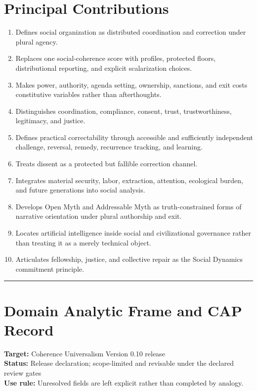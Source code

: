 \documentclass[
  11pt,
]{article}
\providecommand{\tightlist}{%
  \setlength{\itemsep}{0pt}\setlength{\parskip}{0pt}}
\begin{document}
\section{Principal Contributions}\label{principal-contributions}

\begin{enumerate}
\def\labelenumi{\arabic{enumi}.}
\tightlist
\item
  Defines social organization as distributed coordination and correction
  under plural agency.
\item
  Replaces one social-coherence score with profiles, protected floors,
  distributional reporting, and explicit scalarization choices.
\item
  Makes power, authority, agenda setting, ownership, sanctions, and exit
  costs constitutive variables rather than afterthoughts.
\item
  Distinguishes coordination, compliance, consent, trust,
  trustworthiness, legitimacy, and justice.
\item
  Defines practical correctability through accessible and sufficiently
  independent challenge, reversal, remedy, recurrence tracking, and
  learning.
\item
  Treats dissent as a protected but fallible correction channel.
\item
  Integrates material security, labor, extraction, attention, ecological
  burden, and future generations into social analysis.
\item
  Develops Open Myth and Addressable Myth as truth-constrained forms of
  narrative orientation under plural authorship and exit.
\item
  Locates artificial intelligence inside social and civilizational
  governance rather than treating it as a merely technical object.
\item
  Articulates fellowship, justice, and collective repair as the Social
  Dynamics commitment principle.
\end{enumerate}

\begin{center}\rule{0.5\linewidth}{0.5pt}\end{center}

\section{Domain Analytic Frame and CAP
Record}\label{domain-analytic-frame-and-cap-record}

\textbf{Target:} Coherence Universalism Version 0.10 release\\
\textbf{Status:} Release declaration; scope-limited and revisable under
the declared review gates\\
\textbf{Use rule:} Unresolved fields are left explicit rather than
completed by analogy.
\end{document}
